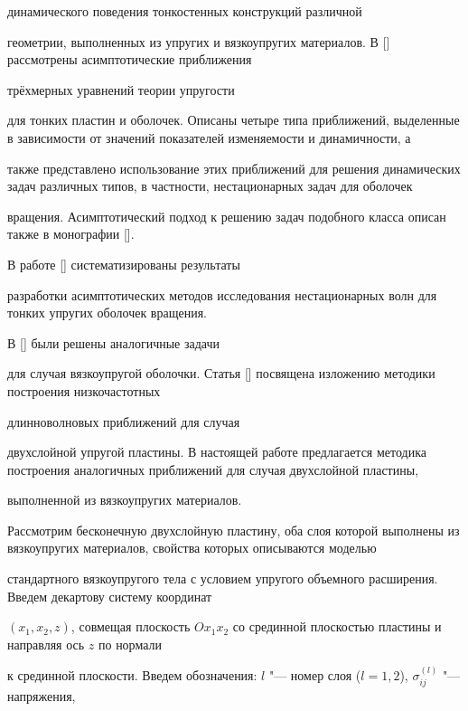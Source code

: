  динамического поведения тонкостенных конструкций различной

 геометрии, выполненных из упругих и вязкоупругих материалов. В [] рассмотрены асимптотические приближения

 трёхмерных уравнений теории упругости

 для тонких пластин и оболочек. Описаны четыре типа приближений, выделенные в зависимости от значений показателей изменяемости и динамичности, а

 также представлено использование этих приближений для решения динамических задач различных типов, в частности, нестационарных задач для оболочек

 вращения. Асимптотический подход к решению задач подобного класса описан также в монографии [].

 В работе [] систематизированы результаты

 разработки асимптотических методов исследования нестационарных волн для тонких упругих оболочек вращения.

 В [] были решены аналогичные задачи

 для случая вязкоупругой оболочки. Статья [] посвящена изложению методики построения низкочастотных

 длинноволновых приближений для случая

 двухслойной упругой пластины. В настоящей работе предлагается методика построения аналогичных приближений для случая двухслойной пластины,

 выполненной из вязкоупругих материалов.



\smallskip




Рассмотрим бесконечную двухслойную пластину, оба слоя которой выполнены из вязкоупругих материалов, свойства которых описываются моделью

 стандартного вязкоупругого тела с условием упругого объемного расширения. Введем декартову систему координат

$(x_1,x_2,z)$, совмещая плоскость $Ox_1x_2$ со срединной плоскостью пластины и направляя ось $z$ по нормали

 к срединной плоскости. Введем обозначения: $l$ "--- номер слоя ($l=1, 2$), $\sigma _{ij}^{(l)} $ "--- напряжения,

